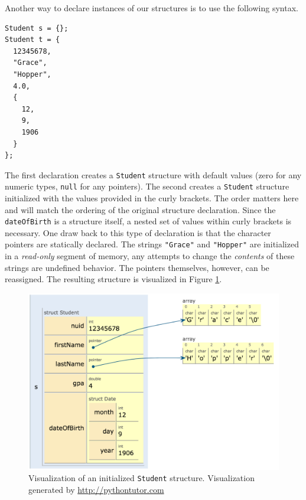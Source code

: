 Another way to declare instances of our structures
is to use the following syntax.

\begin{verbatim}
Student s = {};
Student t = {
  12345678,
  "Grace",
  "Hopper",
  4.0,
  {
    12,
    9,
    1906
  }
};
\end{verbatim}

The first declaration creates a \texttt{Student} structure
with default values (zero for any numeric types, \texttt{null}
for any pointers).  The second creates a \texttt{Student}
structure initialized with the values provided in the curly brackets.
The order matters here and will match the ordering of the original
structure declaration.  Since the \texttt{dateOfBirth} is a
structure itself, a nested set of values within curly brackets is 
necessary.  One draw back to this type of declaration is that the
character pointers are statically declared.  The strings \texttt{"Grace"} and \texttt{"Hopper"} are initialized in a 
\emph{read-only} segment of memory, any attempts to change
the \emph{contents} of these strings are undefined behavior.  
The pointers themselves, however, can be reassigned.  The resulting
structure is visualized in Figure \ref{fig:studentStructViz}.

\begin{figure}
\centering
\includegraphics[scale=.25]{images/studentStructViz}
\caption{Visualization of an initialized \texttt{Student} structure.
Visualization generated by \url{http://pythontutor.com}}
\label{fig:studentStructViz}
\end{figure}

